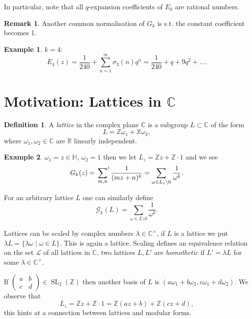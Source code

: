 \documentclass{article}
\theoremstyle{definition}
\newtheorem*{defn}{Definition}
\newtheorem*{ex}{Example}
\newtheorem*{rem}{Remark}
\DeclareMathOperator{\SL}{SL}
\begin{document}
In particular, note that all $q$-expansion coefficients of $E_k$ are rational numbers.

\begin{rem}
Another common normalisation of $G_k$ is s.t. the constant coefficient becomes 1.
\end{rem}

\begin{ex}
$k=4$:
\[E_4(z) = \frac{1}{240} + \sum_{n=1}^{\infty} \sigma_3(n)q^n = \frac{1}{240} + q + 9q^2 + \ldots.\]
\end{ex}

\section{Motivation: Lattices in $\mathbb{C}$}

\begin{defn}
A \emph{lattice} in the complex plane $\mathbb{C}$ is a subgroup $L\subset \mathbb{C}$ of the form
\[L = \mathbb{Z}\omega_1 + \mathbb{X}\omega_2,\]
where $\omega_1,\omega_2\in\mathbb{C}$ are $\mathbb{R}$ linearly independent.
\end{defn}

\begin{ex}
$\omega_1=z\in\mathbb{H}$, $\omega_2=1$ then we let $L_z = \mathbb{Z}z + \mathbb{Z}\cdot 1$ and we see
\[G_k(z) = \sideset{}{'}\sum_{m,n}\frac{1}{(mz+n)^k} = \sum_{\omega\in L_z\setminus 0} \frac{1}{\omega^k}.\]

For an arbitrary lattice $L$ one can similarly define
\[\mathcal{G}_k(L) = \sum_{\omega\in L\setminus0} \frac{1}{\omega^k}.\]
\end{ex}

Lattices can be scaled by complex numbers $\lambda\in\mathbb{C}^\times$, if $L$ is a lattice we put $\lambda L = \{\lambda\omega\mid \omega\in L\}$.
This is again a lattice.
Scaling defines an equivalence relation on the set $\mathcal{L}$ of all lattices in $\mathbb{C}$, two lattices $L,L'$ are \emph{homothetic} if $L'=  \lambda L$ for some $\lambda\in\mathbb{C}^\times$.



If $\begin{pmatrix}
a&b\\c&d
\end{pmatrix}\in\SL_2(\mathbb{Z})$ then another basis  of $L$ is $(a\omega_1 + b\omega_2, c\omega_1 + d\omega_2)$.
We observe that
\[L_z = \mathbb{Z}z + \mathbb{Z}\cdot 1 = \mathbb{Z}(az+b) + \mathbb{Z}(cz+d),\]
this hints at a connection between lattices and modular forms.
\end{document}
